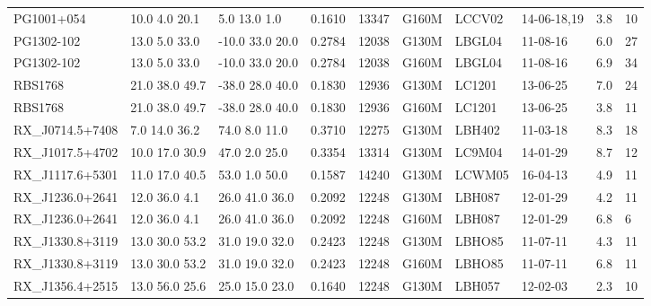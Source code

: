 \documentclass[iop]{emulateapj-rtx4}
\begin{document}
\begin{table}[ht]
\begin{center}
\begin{tabular}{l l l l l l l l l l}
PG1001+054		&    10.0  4.0  20.1  &       5.0  13.0  1.0    &    0.1610  & 13347  		    &   G160M  &   LCCV02   		& 14-06-18,19  		   &  3.8   &      10         \\
PG1302-102  		&    13.0  5.0  33.0  &    -10.0  33.0  20.0  &   0.2784  & 12038  		    &   G130M  &   LBGL04  		& 11-08-16  		   &  6.0   &      27         \\
PG1302-102  		&    13.0  5.0  33.0  &    -10.0  33.0  20.0  &   0.2784  & 12038  		    &   G160M  &   LBGL04  		& 11-08-16  		   &  6.9   &      34         \\
RBS1768  		&  21.0  38.0  49.7  &    -38.0  28.0  40.0  &   0.1830  & 12936  		    &   G130M  &   LC1201 		& 13-06-25		   &  7.0   &      24         \\
RBS1768  		&  21.0  38.0  49.7  &    -38.0  28.0  40.0  &   0.1830  & 12936		    &   G160M  &   LC1201  		& 13-06-25  		   &  3.8   &      11         \\
RX\_J0714.5+7408  &     7.0  14.0  36.2  &      74.0  8.0  11.0   &   0.3710  & 12275  		    &   G130M  &   LBH402   		& 11-03-18   		   &  8.3   &      18         \\
RX\_J1017.5+4702  &   10.0  17.0  30.9  &      47.0  2.0  25.0   &   0.3354  & 13314  		    &   G130M  &   LC9M04		& 14-01-29		   &  8.7   &      12         \\
RX\_J1117.6+5301  &    11.0  17.0  40.5  &      53.0  1.0  50.0   &   0.1587  & 14240  		    &   G130M  &   LCWM05		& 16-04-13		   &  4.9   &      11         \\
RX\_J1236.0+2641  &     12.0  36.0  4.1  &    26.0  41.0  36.0   &   0.2092  & 12248  		    &   G130M  &   LBH087  		& 12-01-29  		   &  4.2   &      11         \\
RX\_J1236.0+2641  &     12.0  36.0  4.1  &    26.0  41.0  36.0   &   0.2092  & 12248  		    &   G160M  &   LBH087 		& 12-01-29  		   &  6.8   &       6          \\
RX\_J1330.8+3119  &   13.0  30.0  53.2  &    31.0  19.0  32.0   &   0.2423  & 12248  		    &   G130M  &   LBHO85  		& 11-07-11		   &   4.3  &      11         \\
RX\_J1330.8+3119  &   13.0  30.0  53.2  &    31.0  19.0  32.0   &   0.2423  & 12248  		    &   G160M  &   LBHO85  		& 11-07-11		   &   6.8  &      11         \\
RX\_J1356.4+2515  &   13.0  56.0  25.6  &    25.0  15.0  23.0   &   0.1640  & 12248  		    &   G130M  &   LBH057			& 12-02-03		   &   2.3  &      10         \\

\end{tabular}
\end{center}
\end{table}
\end{document}
